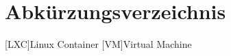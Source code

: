 \chapter*{Abkürzungsverzeichnis}
\label{chap:ACRONYM}

\begin{acronym}[Bash]
  [LXC]{Linux Container}
  [VM]{Virtual Machine}

\end{acronym}

\newpage
